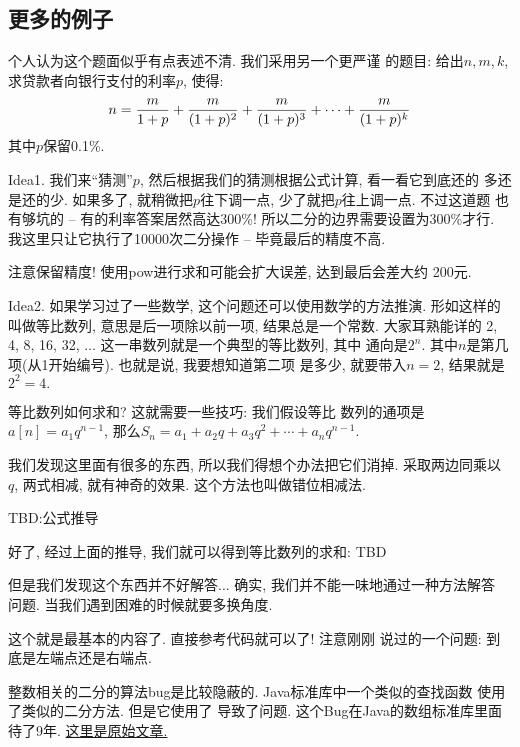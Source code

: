 \subsection{更多的例子}

 个人认为这个题面似乎有点表述不清. 我们采用另一个更严谨
的题目: 给出$n,m,k$, 求贷款者向银行支付的利率$p$, 使得: 
$$
n={m\over 1+p} +{m\over (1+p)^2}+{m\over (1+p)^3}+\cdots + {m\over (1+p)^k} 
$$
其中$p$保留0.1\%.  

Idea1. 我们来``猜测''$p$, 然后根据我们的猜测根据公式计算, 看一看它到底还的
多还是还的少. 如果多了, 就稍微把$p$往下调一点, 少了就把$p$往上调一点. 不过这道题
也有够坑的 -- 有的利率答案居然高达300\%! 所以二分的边界需要设置为300\%才行. 
我这里只让它执行了10000次二分操作 -- 毕竟最后的精度不高. 

\begin{remark}
    注意保留精度! 使用pow进行求和可能会扩大误差, 达到最后会差大约
    200元. 
\end{remark}

Idea2. 如果学习过了一些数学, 这个问题还可以使用数学的方法推演. 形如这样的
叫做等比数列, 意思是后一项除以前一项, 结果总是一个常数. 大家耳熟能详的
2, 4, 8, 16, 32, $\dots$ 这一串数列就是一个典型的等比数列, 其中
通向是$2^n$. 其中$n$是第几项(从1开始编号). 也就是说, 我要想知道第二项
是多少, 就要带入$n=2$, 结果就是$2^2=4.$ 

 等比数列如何求和? 这就需要一些技巧: 我们假设等比
数列的通项是$a[n]=a_1q^{n-1}$, 
那么$S_n=a_1 + a_2q + a_3 q^2 +\cdots +a_n q^{n-1}$. 

我们发现这里面有很多的东西, 所以我们得想个办法把它们消掉. 采取两边同乘以
$q$, 两式相减, 就有神奇的效果. 这个方法也叫做错位相减法. 

TBD:公式推导

好了, 经过上面的推导, 我们就可以得到等比数列的求和: TBD

但是我们发现这个东西并不好解答... 确实, 我们并不能一味地通过一种方法解答
问题. 当我们遇到困难的时候就要多换角度. 

 这个就是最基本的内容了. 直接参考代码就可以了! 注意刚刚
说过的一个问题: 到底是左端点还是右端点. 

\begin{remark}
    整数相关的二分的算法bug是比较隐蔽的. Java标准库中一个类似的查找函数
    使用了类似的二分方法. 但是它使用了
    导致了问题. 这个Bug在Java的数组标准库里面待了9年. 
    \href{https://dev.to/matheusgomes062/a-bug-was-found-in-java-after-almost-9-years-of-hiding-2d4k}{这里是原始文章.}
\end{remark}


